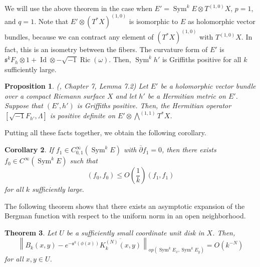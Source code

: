 \documentclass{amsart}
\newtheorem{thm}{Theorem}[section]
\newtheorem{cor}[thm]{Corollary}
\newtheorem{prop}[thm]{Proposition}
\theoremstyle{definition}
\theoremstyle{remark}
\numberwithin{equation}{section}
\DeclareMathOperator{\Sym}{Sym}
\DeclareMathOperator{\Id}{Id}
\DeclareMathOperator{\Ric}{Ric}
\begin{document}
We will use the above theorem in the case when $E' = \Sym^kE \otimes T^{(1,0)}X$, $p = 1$, and $q = 1$. Note that $E' \otimes (T^*X)^{(1,0)}$ is isomorphic to $E$ as holomorphic vector bundles, because we can contract any element of $(T^*X)^{(1,0)}$ with $T^{(1,0)}X$. In fact, this is an isometry between the fibers. The curvature form of $E'$ is $\mathfrak{s}^k F_h \otimes 1 + \Id \otimes -\sqrt{-1} \Ric(\omega)$. Then, $\Sym^k h'$ is Griffiths positive for all $k$ sufficiently large.

\begin{prop} \textnormal{(\cite{D}, Chapter 7, Lemma 7.2)}
Let $E'$ be a holomorphic vector bundle over a compact Riemann surface $X$ and let $h'$ be a Hermitian metric on $E'$. Suppose that $(E',h')$ is Griffiths positive. Then, the Hermitian operator $[\sqrt{-1} F_{h'},\Lambda]$ is positive definite on $E' \otimes \bigwedge^{(1,1)}T^*X$. 
\end{prop}


Putting all these facts together, we obtain the following corollary.
\begin{cor} \label{cor: Hormander}
If $f_1 \in C^\infty_{0,1}(\Sym^kE)$ with $\overline{\partial}f_1 = 0$, then there exists $f_0 \in C^\infty(\Sym^kE)$ such that
$$
(f_0,f_0) \leq O\left ( \frac{1}{k} \right ) (f_1,f_1)
$$
for all $k$ sufficiently large.
\end{cor}


The following theorem shows that there exists an asymptotic expansion of the Bergman function with respect to the uniform norm in an open neighborhood.



\begin{thm} \label{thm: C_0}
Let $U$ be a sufficiently small coordinate unit disk in $X$. Then,
$$
\left \| B_k(x,y) - e^{-\mathfrak{s}^k(\phi(x))} \overline{K_k^{(N)}(x,y)} \right \|_{op(\Sym^k E_x,\Sym^kE_y)} = O\left ( k^{-N} \right )
$$
for all $x,y \in U$.
\end{thm}
\end{document}
